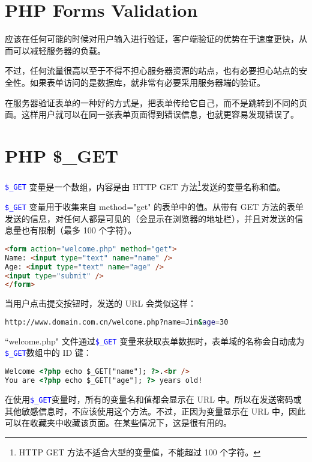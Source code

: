 \chapter{PHP Forms Validation}

应该在任何可能的时候对用户输入进行验证，客户端验证的优势在于速度更快，从而可以减轻服务器的负载。


不过，任何流量很高以至于不得不担心服务器资源的站点，也有必要担心站点的安全性。如果表单访问的是数据库，就非常有必要采用服务器端的验证。

在服务器验证表单的一种好的方式是，把表单传给它自己，而不是跳转到不同的页面。这样用户就可以在同一张表单页面得到错误信息，也就更容易发现错误了。



\chapter{PHP \$\_GET}

\textcolor{Blue}{\texttt{\$\_GET}} 变量是一个数组，内容是由 HTTP GET 方法\footnote{HTTP GET 方法不适合大型的变量值，不能超过 100 个字符。}发送的变量名称和值。


\textcolor{Blue}{\texttt{\$\_GET}} 变量用于收集来自 method="get" 的表单中的值。从带有 GET 方法的表单发送的信息，对任何人都是可见的（会显示在浏览器的地址栏），并且对发送的信息量也有限制（最多 100 个字符）。

\begin{lstlisting}[language=HTML]
<form action="welcome.php" method="get">
Name: <input type="text" name="name" />
Age: <input type="text" name="age" />
<input type="submit" />
</form>
\end{lstlisting}

当用户点击提交按钮时，发送的 URL 会类似这样：

\begin{lstlisting}[language=bash]
http://www.domain.com.cn/welcome.php?name=Jim&age=30
\end{lstlisting}

``welcome.php" 文件通过\textcolor{Blue}{\texttt{\$\_GET}} 变量来获取表单数据时，表单域的名称会自动成为\textcolor{Blue}{\texttt{\$\_GET}}数组中的 ID 键：

\begin{lstlisting}[language=HTML]
Welcome <?php echo $_GET["name"]; ?>.<br />
You are <?php echo $_GET["age"]; ?> years old!
\end{lstlisting}

在使用\textcolor{Blue}{\texttt{\$\_GET}}变量时，所有的变量名和值都会显示在 URL 中。所以在发送密码或其他敏感信息时，不应该使用这个方法。不过，正因为变量显示在 URL 中，因此可以在收藏夹中收藏该页面。在某些情况下，这是很有用的。


